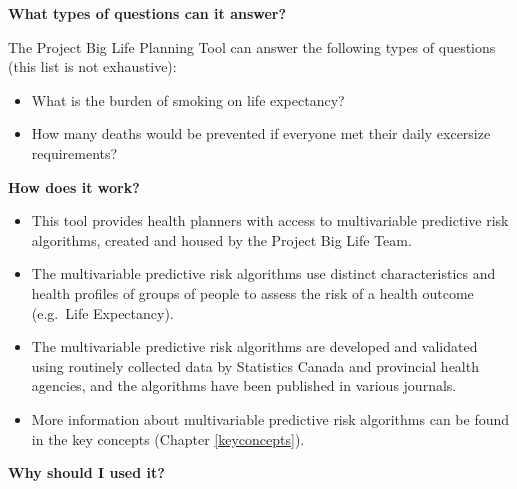 \documentclass[]{book}
\providecommand{\tightlist}{%
  \setlength{\itemsep}{0pt}\setlength{\parskip}{0pt}}
\begin{document}
\textbf{What types of questions can it answer?}

The Project Big Life Planning Tool can answer the following types of
questions (this list is not exhaustive):

\begin{itemize}
\tightlist
\item
  What is the burden of smoking on life expectancy?
\item
  How many deaths would be prevented if everyone met their daily
  excersize requirements?
\end{itemize}

\textbf{How does it work?}

\begin{itemize}
\item
  This tool provides health planners with access to multivariable
  predictive risk algorithms, created and housed by the Project Big Life
  Team.
\item
  The multivariable predictive risk algorithms use distinct
  characteristics and health profiles of groups of people to assess the
  risk of a health outcome (e.g.~Life Expectancy).
\item
  The multivariable predictive risk algorithms are developed and
  validated using routinely collected data by Statistics Canada and
  provincial health agencies, and the algorithms have been published in
  various journals.
\item
  More information about multivariable predictive risk algorithms can be
  found in the key concepts (Chapter \ref{keyconcepts}).
\end{itemize}

\textbf{Why should I used it?}
\end{document}
